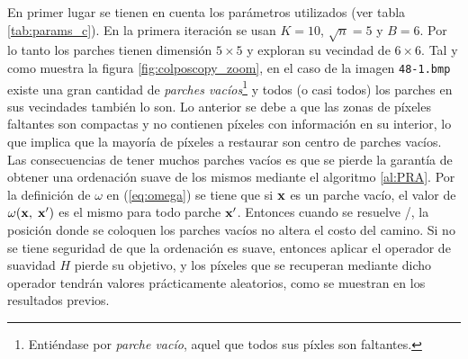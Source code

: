  En primer lugar se tienen en cuenta los par\'ametros utilizados (ver tabla \ref{tab:params_c}). En la primera iteraci\'on se usan $K=10$, $\sqrt{n}=5$ y $B=6$. Por lo tanto los parches tienen dimensi\'on $5 \times 5$ y exploran su vecindad de $6 \times 6$. Tal y como muestra la figura \ref{fig:colposcopy_zoom}, en el caso de la imagen \texttt{48-1.bmp} existe una gran cantidad de \textit{parches vac\'ios}\footnote{Enti\'endase por \textit{parche vac\'io}, aquel que todos sus p\'ixles son faltantes.} y todos (o casi todos) los parches en sus vecindades tambi\'en lo son. Lo anterior se debe a que las zonas de p\'ixeles faltantes son compactas y no contienen p\'ixeles con informaci\'on en su interior, lo que implica que la mayor\'ia de p\'ixeles a restaurar son centro de parches vac\'ios. Las consecuencias de tener muchos parches vac\'ios es que se pierde la garant\'ia de obtener una ordenaci\'on suave de los mismos mediante el algoritmo \ref{al:PRA}. Por la definici\'on de $\omega$ en (\ref{eq:omega}) se tiene que si $\mathbf{x}$ es un parche vac\'io, el valor de $\omega(\mathbf{x},\; \mathbf{x}')$ es el mismo para todo parche $\mathbf{x}'$. Entonces cuando se resuelve \TSP/, la posici\'on donde se coloquen los parches vac\'ios no altera el costo del camino. Si no se tiene seguridad de que la ordenaci\'on es suave, entonces aplicar el operador de suavidad $H$ pierde su objetivo, y los p\'ixeles que se recuperan mediante dicho operador tendr\'an valores pr\'acticamente aleatorios, como se muestran en los resultados previos.
 

